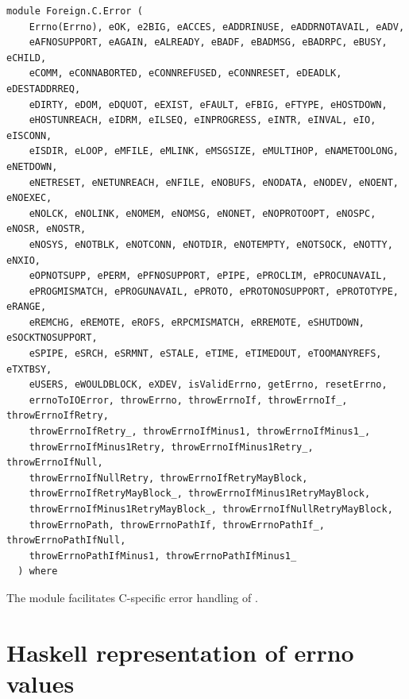 \label{module:Foreign.C.Error}
\haddockbeginheader
{\haddockverb\begin{verbatim}
module Foreign.C.Error (
    Errno(Errno), eOK, e2BIG, eACCES, eADDRINUSE, eADDRNOTAVAIL, eADV,
    eAFNOSUPPORT, eAGAIN, eALREADY, eBADF, eBADMSG, eBADRPC, eBUSY, eCHILD,
    eCOMM, eCONNABORTED, eCONNREFUSED, eCONNRESET, eDEADLK, eDESTADDRREQ,
    eDIRTY, eDOM, eDQUOT, eEXIST, eFAULT, eFBIG, eFTYPE, eHOSTDOWN,
    eHOSTUNREACH, eIDRM, eILSEQ, eINPROGRESS, eINTR, eINVAL, eIO, eISCONN,
    eISDIR, eLOOP, eMFILE, eMLINK, eMSGSIZE, eMULTIHOP, eNAMETOOLONG, eNETDOWN,
    eNETRESET, eNETUNREACH, eNFILE, eNOBUFS, eNODATA, eNODEV, eNOENT, eNOEXEC,
    eNOLCK, eNOLINK, eNOMEM, eNOMSG, eNONET, eNOPROTOOPT, eNOSPC, eNOSR, eNOSTR,
    eNOSYS, eNOTBLK, eNOTCONN, eNOTDIR, eNOTEMPTY, eNOTSOCK, eNOTTY, eNXIO,
    eOPNOTSUPP, ePERM, ePFNOSUPPORT, ePIPE, ePROCLIM, ePROCUNAVAIL,
    ePROGMISMATCH, ePROGUNAVAIL, ePROTO, ePROTONOSUPPORT, ePROTOTYPE, eRANGE,
    eREMCHG, eREMOTE, eROFS, eRPCMISMATCH, eRREMOTE, eSHUTDOWN, eSOCKTNOSUPPORT,
    eSPIPE, eSRCH, eSRMNT, eSTALE, eTIME, eTIMEDOUT, eTOOMANYREFS, eTXTBSY,
    eUSERS, eWOULDBLOCK, eXDEV, isValidErrno, getErrno, resetErrno,
    errnoToIOError, throwErrno, throwErrnoIf, throwErrnoIf_, throwErrnoIfRetry,
    throwErrnoIfRetry_, throwErrnoIfMinus1, throwErrnoIfMinus1_,
    throwErrnoIfMinus1Retry, throwErrnoIfMinus1Retry_, throwErrnoIfNull,
    throwErrnoIfNullRetry, throwErrnoIfRetryMayBlock,
    throwErrnoIfRetryMayBlock_, throwErrnoIfMinus1RetryMayBlock,
    throwErrnoIfMinus1RetryMayBlock_, throwErrnoIfNullRetryMayBlock,
    throwErrnoPath, throwErrnoPathIf, throwErrnoPathIf_, throwErrnoPathIfNull,
    throwErrnoPathIfMinus1, throwErrnoPathIfMinus1_
  ) where\end{verbatim}}
\haddockendheader

The module  facilitates C-specific error handling of
 .\par
\section{Haskell representation of errno values}
\begin{haddockdesc}
\item[\begin{tabular}{@{}l}
instance Eq Errno
\end{tabular}]
\end{haddockdesc}
